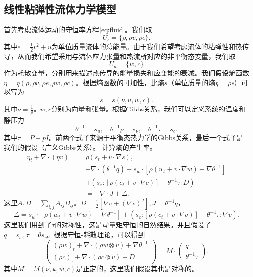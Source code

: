 	\subsection{线性粘弹性流体力学模型}
	首先考虑流体运动的守恒率方程\eqref{eq:fluid}。我们取
	\begin{equation*}
		U_c = \{\rho, \rho v, \rho e\}.
	\end{equation*}
	其中$e = \frac{1}{2} v^2 + u$为单位质量流体的总能量。由于我们希望考虑流体的粘弹性和热传导，从而我们希望采用与流体应力张量和热流所对应的非平衡态变量，我们取
	\begin{equation*}
		U_d = \{ w, c\}
	\end{equation*}
	作为耗散变量，分别用来描述热传导的能量损失和应变能的衰减。我们假设熵函数$\eta = \eta (\rho,\rho v ,\rho e, \rho w, \rho c)$。根据熵函数的可加性，比熵$s$（单位质量的熵$\eta = \rho s$）可以写为
	\begin{equation*}
		s = s(\nu, u, w, c).
	\end{equation*}
	其中$\nu = \frac{1}{\rho}$。$w,c$分别为向量和张量。根据Gibbs关系，我们可以定义系统的温度和静压力
	\begin{equation*}
		\theta^{-1} = s_u, \quad \theta^{-1} p = s_{\nu}, \quad \theta^{-1} \tau = s_c.
	\end{equation*}
	其中$\tau = P - pI$。前两个式子来源于平衡态热力学的Gibbs关系，最后一个式子是我们的假设（广义Gibbs关系）。
    计算熵的产生率。
	\begin{eqnarray*}
		\eta_t + \nabla \cdot (\eta v) &=& \rho (s_t + v \cdot \nabla s), \\
		&=& -\nabla \cdot (\theta^{-1} q) + s_w \cdot [\rho (w_t + v \cdot \nabla w) + \nabla \theta^{-1}] \\
		&&+ (s_c:[\rho (c_t + v \cdot \nabla c)] - \theta^{-1} \tau : D) \\
		&& = -\nabla \cdot J + \Delta.
	\end{eqnarray*}
	这里$A:B = \sum_{i,j}A_{ij}B_{ij}$。$D = \frac{1}{2} [\nabla v + (\nabla v)^T], J =\theta^{-1} q $，
	\begin{equation*}
		\Delta = s_w \cdot [\rho (w_t + v \cdot \nabla w) + \nabla \theta^{-1}] + (s_c:[\rho (c_t + v \cdot \nabla v)] - \theta^{-1} \tau : \nabla v) .
	\end{equation*}
	这里我们用到了$\tau$的对称性，这是动量矩守恒的自然结果\cite{dimitrienko2010nonlinear}。并且假设了$q =s_w,\tau = \theta s_c$。根据守恒-耗散理论，可以得到
	\begin{equation} \label{eq:CDFgeneral  }
		\left( \begin{array}{c} 
			(\rho w)_t +  \nabla \cdot (\rho w \otimes v)  + \nabla \theta^{-1} \\
			(\rho c)_t +  \nabla \cdot (\rho c \otimes v)  - D
		\end{array} \right) = M \cdot
		\left( \begin{array}{c} 
			q \\ \theta^{-1} \tau
		\end{array}\right).
	\end{equation}
	其中$M=M(\nu,u,w,c)$是正定的，这里我们假设其也是对称的。

